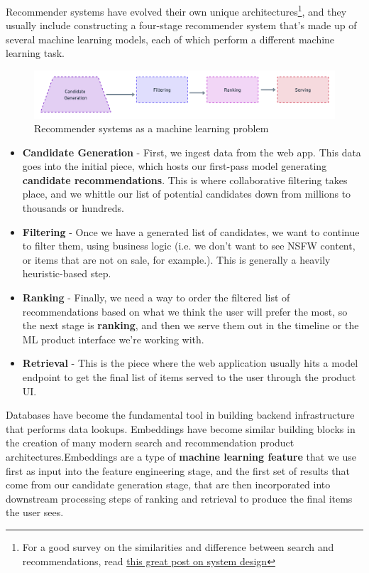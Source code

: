 \documentclass[11pt, table]{diazessay} %
\begin{document}
\begin{sloppypar}
Recommender systems have evolved  their own unique architectures\footnote{For a good survey on the similarities and difference between search and recommendations, read \href{https://eugeneyan.com/writing/system-design-for-discovery/}{this great post on system design}}, and they usually include constructing a four-stage recommender system that's made up of several machine learning models, each of which perform a different machine learning task.

\begin{figure}[H]
\centering
\includegraphics[width=\textwidth]{figures/recsys.png}
\caption{Recommender systems as a machine learning problem}
\end{figure}

\begin{itemize}
  \item \textbf{Candidate Generation} - First, we ingest data from the web app.  This data goes into the initial piece, which hosts our first-pass model generating \textbf{candidate recommendations}. This is where collaborative filtering takes place, and we whittle our list of potential candidates down from millions to thousands or hundreds.
  \item \textbf{Filtering} - Once we have a generated list of candidates, we want to continue to filter them, using business logic (i.e. we don't want to see NSFW content, or items that are not on sale, for example.). This is generally a heavily heuristic-based step.
  \item \textbf{Ranking} - Finally, we need a way to order the filtered list of recommendations based on what we think the user will prefer the most, so the next stage is \textbf{ranking}, and then we serve them out in the timeline or the ML product interface we're working with.
  \item \textbf{Retrieval} - This is the piece where the web application usually hits a model endpoint to get the final list of items served to the user through the product UI.
\end{itemize}
    
Databases have become the fundamental tool in building backend infrastructure that performs data lookups. Embeddings have become similar building blocks in the creation of many modern search and recommendation product architectures.Embeddings are a type of \textbf{machine learning feature} that we use first as input into the feature engineering stage, and the first set of results that come from our candidate generation stage, that are then incorporated into downstream processing steps of ranking and retrieval to produce the final items the user sees.


\end{sloppypar}
\end{document}
